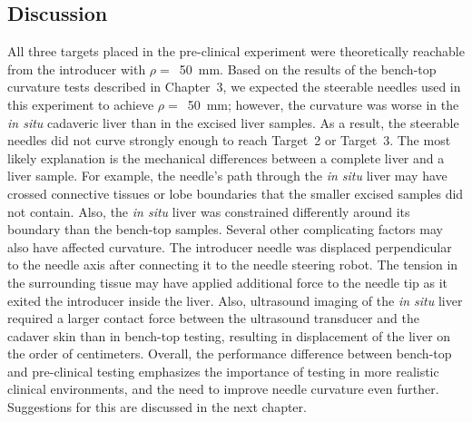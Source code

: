 \subsection{Discussion}
All three targets placed in the pre-clinical experiment were theoretically reachable from the introducer with $\rho =$~50~mm. Based on the results of the bench-top curvature tests described in Chapter~3, we expected the steerable needles used in this experiment to achieve $\rho =$~50~mm; however, the curvature was worse in the \textit{in situ} cadaveric liver than in the excised liver samples. As a result, the steerable needles did not curve strongly enough to reach Target~2 or Target~3. The most likely explanation is the mechanical differences between a complete liver and a liver sample. For example, the needle's path through the \textit{in situ} liver may have crossed connective tissues or lobe boundaries that the smaller excised samples did not contain. Also, the \textit{in situ} liver was constrained differently around its boundary than the bench-top samples. Several other complicating factors may also have affected curvature. The introducer needle was displaced perpendicular to the needle axis after connecting it to the needle steering robot. The tension in the surrounding tissue may have applied additional force to the needle tip as it exited the introducer inside the liver. Also, ultrasound imaging of the \textit{in situ} liver required a larger contact force between the ultrasound transducer and the cadaver skin than in bench-top testing, resulting in displacement of the liver on the order of centimeters. Overall, the performance difference between bench-top and pre-clinical testing emphasizes the importance of testing in more realistic clinical environments, and the need to improve needle curvature even further. Suggestions for this are discussed in the next chapter.

